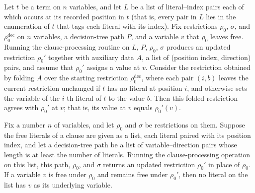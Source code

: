 \begin{lemma}
\label{SwitchingLemma.processClauseLits_foldl_rho_eq_of_set}
\leanok
{}
Let $t$ be a term on $n$ variables, and let $L$ be a list of literal–index pairs each of
which occurs at its recorded position in $t$ (that is, every pair in $L$ lies in the
enumeration of $t$ that tags each literal with its index). Fix restrictions $\rho_0$,
$\sigma$, and $\rho_0^{\mathrm{dec}}$ on $n$ variables, a decision-tree path $P$, and a
variable $v$ that $\rho_0$ leaves free. Running the clause-processing routine on $L$,
$P$, $\rho_0$, $\sigma$ produces an updated restriction $\rho_0'$ together with
auxiliary data $A$, a list of (position index, direction) pairs, and assume that
$\rho_0'$ assigns a value at $v$. Consider the restriction obtained by folding $A$ over
the starting restriction $\rho_0^{\mathrm{dec}}$, where each pair $(i, b)$ leaves the
current restriction unchanged if $t$ has no literal at position $i$, and otherwise sets
the variable of the $i$-th literal of $t$ to the value $b$. Then this folded restriction
agrees with $\rho_0'$ at $v$; that is, its value at $v$ equals $\rho_0'(v)$.
\end{lemma}

\begin{lemma}
\label{SwitchingLemma.processClauseLits_no_target_of_rho_none}
\leanok
{}
Fix a number $n$ of variables, and let $\rho_0$ and $\sigma$ be restrictions on them.
Suppose the free literals of a clause are given as a list, each literal paired with its
position index, and let a decision-tree path be a list of variable–direction pairs whose
length is at least the number of literals. Running the clause-processing operation on
this list, this path, $\rho_0$, and $\sigma$ returns an updated restriction $\rho_0'$ in
place of $\rho_0$. If a variable $v$ is free under $\rho_0$ and remains free under
$\rho_0'$, then no literal on the list has $v$ as its underlying variable.
\end{lemma}

